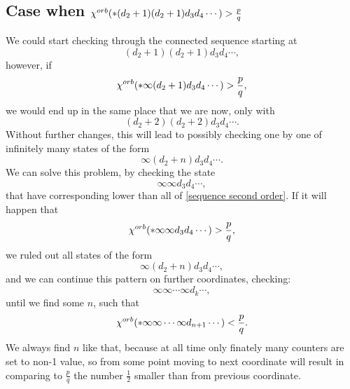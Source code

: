 \subsection{Case when ${\chi^{orb}(*(d_2+1)(d_2+1)d_3d_4\cdots)} > \frac{p}{q}$}\label{greater idea}

We could start checking through the connected sequence starting at 
\begin{equation}
(d_2+1)(d_2+1)d_3d_4\cdots, 
\end{equation}
however, if 
\begin{equation}
{\chi^{orb}(*\infty(d_2+1)d_3d_4\cdots)} > \frac{p}{q}, 
\end{equation}
we would end up in the same place that we are now, only with 
\begin{equation}
(d_2+2)(d_2+2)d_3d_4\cdots.
\end{equation}
Without further changes, this will lead to possibly checking one by one of infinitely many states 
of the form 
\begin{equation}\label{sequence second order}
\infty(d_2+n)d_3d_4\cdots. 
\end{equation}
We can solve this problem, by checking the state 
\begin{equation}
\infty\infty d_3d_4\cdots, 
\end{equation}
that have corresponding \Eoc lower than all of \ref{sequence second order}. 
If it will happen that 
\begin{equation}
{\chi^{orb}(*\infty\infty d_3d_4\cdots)} > \frac{p}{q},
\end{equation}
we ruled out all states of the form
\begin{equation}
\infty(d_2+n)d_3d_4\cdots,
\end{equation}
and we can continue this pattern on further coordinates, checking: 
\begin{equation}
\infty\infty \cdots \infty d_k\cdots, 
\end{equation}
until we find some $n$, such that
\begin{equation}
{\chi^{orb}(*\infty\infty \cdots \infty d_{n+1}\cdots)} < \frac{p}{q}.
\end{equation}
We always find $n$ like that, because at all time only finately many counters are set 
to non-1 value, so from some point moving to next coordinate will result in 
comparing to $\frac{p}{q}$ the number $\frac{1}{2}$ smaller than from previous coordinate. 

